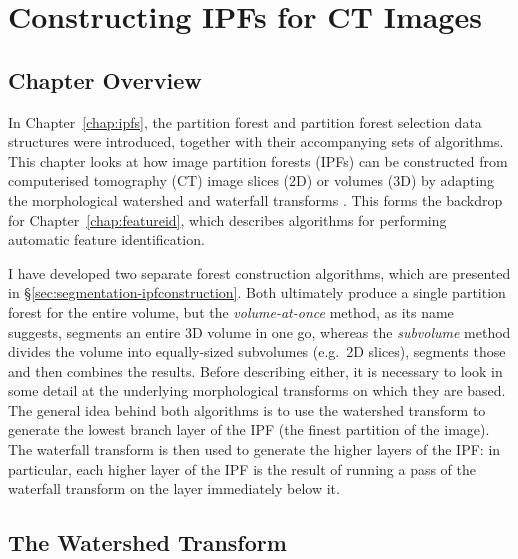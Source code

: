 \chapter{Constructing IPFs for CT Images}
\label{chap:segmentation}

\section{Chapter Overview}

In Chapter~\ref{chap:ipfs}, the partition forest and partition forest selection data structures were introduced, together with their accompanying sets of algorithms. This chapter looks at how image partition forests (IPFs) can be constructed from computerised tomography (CT) image slices (2D) or volumes (3D) by adapting the morphological watershed and waterfall transforms \cite{beucher94,marcotegui05}. This forms the backdrop for Chapter~\ref{chap:featureid}, which describes algorithms for performing automatic feature identification.

I have developed two separate forest construction algorithms, which are presented in \S\ref{sec:segmentation-ipfconstruction}. Both ultimately produce a single partition forest for the entire volume, but the \emph{volume-at-once} method, as its name suggests, segments an entire 3D volume in one go, whereas the \emph{subvolume} method divides the volume into equally-sized subvolumes (e.g.~2D slices), segments those and then combines the results. Before describing either, it is necessary to look in some detail at the underlying morphological transforms on which they are based. The general idea behind both algorithms is to use the watershed transform to generate the lowest branch layer of the IPF (the finest partition of the image). The waterfall transform is then used to generate the higher layers of the IPF: in particular, each higher layer of the IPF is the result of running a pass of the waterfall transform on the layer immediately below it.

\section{The Watershed Transform}

